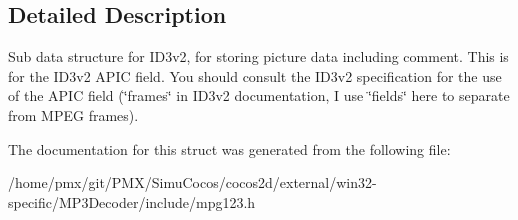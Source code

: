 \subsection{Detailed Description}
Sub data structure for I\+D3v2, for storing picture data including comment. This is for the I\+D3v2 A\+P\+IC field. You should consult the I\+D3v2 specification for the use of the A\+P\+IC field (\char`\"{}frames\char`\"{} in I\+D3v2 documentation, I use \char`\"{}fields\char`\"{} here to separate from M\+P\+EG frames). 

The documentation for this struct was generated from the following file\+:\begin{DoxyCompactItemize}
\item 
/home/pmx/git/\+P\+M\+X/\+Simu\+Cocos/cocos2d/external/win32-\/specific/\+M\+P3\+Decoder/include/mpg123.\+h\end{DoxyCompactItemize}
